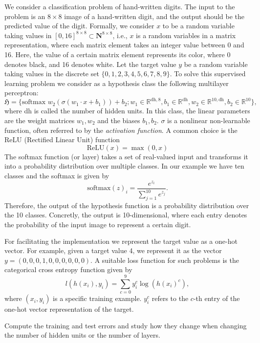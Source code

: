 \begin{boxedexample}[Classification] \complementary{\theexample}
    \label{ex:classification}
    We consider a classification problem of hand-written digits. The input to
    the problem is an $8 \times 8$ image of a hand-written digit, and the output
    should be the predicted value of the digit. Formally, we consider $x$ to be a
    random variable taking values in $[0, 16]^{8 \times 8} \subset
    \mathbf{N}^{8 \times 8}$, i.e., $x$ is a random variables in a matrix
    representation, where each matrix element takes an integer value between 0
    and 16. Here, the value of a certain matrix element represents its color,
    where 0 denotes black, and 16 denotes white. Let the target value $y$ be a
    random variable taking values in the discrete set $\{0,1,2,3,4,5,6,7,8,9\}$.
    To solve this supervised learning problem we consider as a hypothesis class
    the following multilayer perceptron:
    \begin{equation*}
        \mathfrak{H} = \bigl\{\text{softmax } w_2 \left(\sigma (w_1 \cdot x + b_1 ) \right) + b_2 ; w_1 \in \mathbb{R}^{\text{dh}, 8}, b_1 \in \mathbb{R}^{\text{dh}}, w_2 \in \mathbb{R}^{10, \text{dh}}, b_2 \in \mathbb{R}^{10}   \bigr\},
    \end{equation*}
    where dh is called the number of hidden units. In this class, the linear
    parameters are the weight matrices $w_1, w_2$ and the biases $b_1, b_2$.
    $\sigma$ is a nonlinear non-learnable function, often referred to by the \emph{activation function}. A common choice
    is the ReLU (Rectified Linear Unit) function
    \begin{equation*}
        \text{ReLU}(x) = \max(0, x)    
    \end{equation*}
 The softmax function (or layer) takes a set of real-valued input  and
 transforms it into a probability distribution over multiple classes. In our
 example we have ten classes and the softmax is given by
    \begin{equation*}
        \text{softmax}(z)_i = \frac{e^{z_i}}{\sum_{j=1}^{10} e^{z_j}}.
    \end{equation*}
    Therefore, the output of the hypothesis function is a probability distribution
    over the 10 classes. Concretly, the output is 10-dimensional, where each entry
    denotes the probability of the input image to represent a certain digit. 
    
    For facilitating the implementation we represent the target value as a one-hot
    vector. For example, given a target value 4, we represent it as the vector $y =
    (0,0,0,1,0,0,0,0,0,0)$. A suitable loss function for such problems is the
    categorical cross
    entropy
    function given by 
    \begin{equation*}
        l(h(x_i), y_i) = \sum_{c=0}^9 y_{i}^c \log(h(x_i)^c),
    \end{equation*}
    where $(x_i, y_i)$ is a specific training example. $y_{i}^c$ refers to the
    $c$-th entry of the one-hot vector representation of the target.

    Compute the training and test errors and study how they change when changing
    the number of hidden units or the number of layers.
\end{boxedexample}

